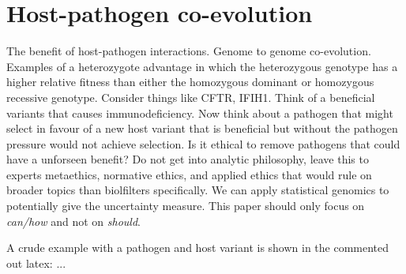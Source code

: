 \documentclass[preprint,11pt,fleqn]{elsarticle}
\begin{document}
\section{Host-pathogen co-evolution}
The benefit of host-pathogen interactions.
Genome to genome co-evolution.
Examples of a heterozygote advantage in which the heterozygous genotype has a higher relative fitness than either the homozygous dominant or homozygous recessive genotype. 
Consider things like CFTR, IFIH1. 
Think of a beneficial variants that causes immunodeficiency. 
Now think about a pathogen that might select in favour of a new host variant that is beneficial but without the pathogen pressure would not achieve selection. 
Is it ethical to remove pathogens that could have a unforseen benefit? 
Do not get into analytic philosophy, leave this to experts metaethics, normative ethics, and applied ethics that would rule on broader topics than biolfilters specifically.
We can apply statistical genomics to potentially give the uncertainty measure. 
This paper should only focus on \textit{can/how} and not on \textit{should}. 

A crude example with a pathogen and host variant is shown in the commented out latex: ...\\
% 
% 
% 
%
\end{document}
